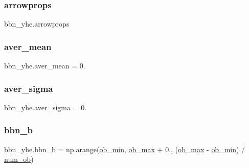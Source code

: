 \subsubsection{\texorpdfstring{arrowprops}{arrowprops}}
{\footnotesize\ttfamily bbn\+\_\+yhe.\+arrowprops}

\mbox{\label{namespacebbn__yhe_a9d5e61e6f78e3497a8c5fce8daedf276}} 
\subsubsection{\texorpdfstring{aver\+\_\+mean}{aver\_mean}}
{\footnotesize\ttfamily bbn\+\_\+yhe.\+aver\+\_\+mean = 0.}

\mbox{\label{namespacebbn__yhe_af08345da95d7b1ecff384b5ca5648a03}} 
\subsubsection{\texorpdfstring{aver\+\_\+sigma}{aver\_sigma}}
{\footnotesize\ttfamily bbn\+\_\+yhe.\+aver\+\_\+sigma = 0.}

\mbox{\label{namespacebbn__yhe_a8da3e95ccabe26e7b02faafa8d0c7d0a}} 
\subsubsection{\texorpdfstring{bbn\+\_\+b}{bbn\_b}}
{\footnotesize\ttfamily bbn\+\_\+yhe.\+bbn\+\_\+b = np.\+arange(\mbox{\hyperlink{namespacebbn__yhe_aa005d4473664db0db345095282beb1ef}{ob\+\_\+min}}, \mbox{\hyperlink{namespacebbn__yhe_a7ad9cbb8dc27628c6fbf6296bba963ca}{ob\+\_\+max}} + 0., (\mbox{\hyperlink{namespacebbn__yhe_a7ad9cbb8dc27628c6fbf6296bba963ca}{ob\+\_\+max}} -\/ \mbox{\hyperlink{namespacebbn__yhe_aa005d4473664db0db345095282beb1ef}{ob\+\_\+min}}) / \mbox{\hyperlink{namespacebbn__yhe_a3aa1ae9b0ed6bd135e4fc002b7eca1a9}{num\+\_\+ob}})}

\mbox{\label{namespacebbn__yhe_a28b53c029dcb7310ef25c077dbf59bab}} 
